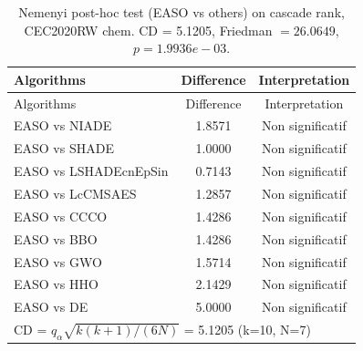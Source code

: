 \begin{center}
\small
\renewcommand{\arraystretch}{1.25}
\begin{longtable}{lcc}
\caption{Nemenyi post-hoc test (EASO vs others) on cascade rank, CEC2020RW  chem. CD = 5.1205, Friedman $=26.0649$, $p=1.9936e-03$.}
\label{tab:nemenyi_cascade_CEC2020RW_chem} \\
\toprule
Algorithms & Difference & Interpretation \\
\midrule
\endfirsthead
\toprule
Algorithms & Difference & Interpretation \\
\midrule
\endhead
EASO vs NIADE & 1.8571 & Non significatif \\
EASO vs SHADE & 1.0000 & Non significatif \\
EASO vs LSHADEcnEpSin & 0.7143 & Non significatif \\
EASO vs LcCMSAES & 1.2857 & Non significatif \\
EASO vs CCCO & 1.4286 & Non significatif \\
EASO vs BBO & 1.4286 & Non significatif \\
EASO vs GWO & 1.5714 & Non significatif \\
EASO vs HHO & 2.1429 & Non significatif \\
EASO vs DE & 5.0000 & Non significatif \\
\midrule
\multicolumn{3}{l}{CD = $q_\alpha \sqrt{k(k+1)/(6N)}$ = 5.1205 (k=10, N=7)} \\
\bottomrule
\end{longtable}
\end{center}